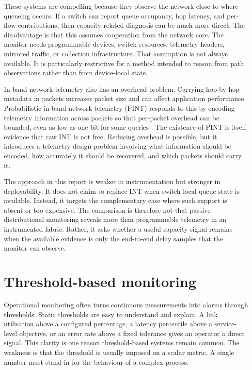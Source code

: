 These systems are compelling because they observe the network close to where queueing occurs. If a switch can report queue occupancy, hop latency, and per-flow contributions, then capacity-related diagnosis can be much more direct. The disadvantage is that this assumes cooperation from the network core. The monitor needs programmable devices, switch resources, telemetry headers, mirrored traffic, or collection infrastructure. That assumption is not always available. It is particularly restrictive for a method intended to reason from path observations rather than from device-local state.

In-band network telemetry also has an overhead problem. Carrying hop-by-hop metadata in packets increases packet size and can affect application performance. Probabilistic in-band network telemetry (PINT) responds to this by encoding telemetry information across packets so that per-packet overhead can be bounded, even as low as one bit for some queries \cite{benBasatPint}. The existence of PINT is itself evidence that raw INT is not free. Reducing overhead is possible, but it introduces a telemetry design problem involving what information should be encoded, how accurately it should be recovered, and which packets should carry it.

The approach in this report is weaker in instrumentation but stronger in deployability. It does not claim to replace INT when switch-local queue state is available. Instead, it targets the complementary case where such support is absent or too expensive. The comparison is therefore not that passive distributional monitoring reveals more than programmable telemetry in an instrumented fabric. Rather, it asks whether a useful capacity signal remains when the available evidence is only the end-to-end delay samples that the monitor can observe.

\section{Threshold-based monitoring}

Operational monitoring often turns continuous measurements into alarms through thresholds. Static thresholds are easy to understand and explain. A link utilisation above a configured percentage, a latency percentile above a service-level objective, or an error rate above a fixed tolerance gives an operator a direct signal. This clarity is one reason threshold-based systems remain common. The weakness is that the threshold is usually imposed on a scalar metric. A single number must stand in for the behaviour of a complex process.

